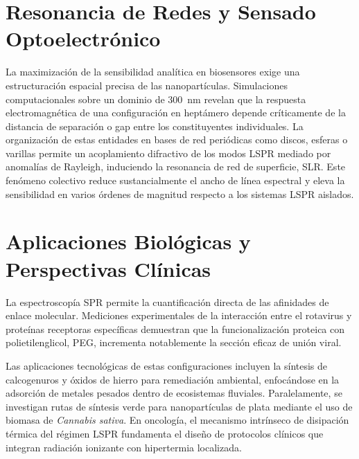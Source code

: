 \documentclass[pdflatex,sn-mathphys-num]{sn-jnl}
\theoremstyle{thmstyleone}%
\theoremstyle{thmstyletwo}%
\theoremstyle{thmstylethree}%
\begin{document}
\section{Resonancia de Redes y Sensado Optoelectrónico}
\label{sec:redes}

La maximización de la sensibilidad analítica en biosensores exige una
estructuración espacial precisa de las nanopartículas. Simulaciones
computacionales sobre un dominio de \qty{300}{\nano\meter} revelan que la
respuesta electromagnética de una configuración en heptámero depende
críticamente de la distancia de separación o gap entre los constituyentes
individuales. La organización de estas entidades en bases de red
periódicas como discos, esferas o varillas permite un acoplamiento
difractivo de los modos LSPR mediado por anomalías de Rayleigh, induciendo la
resonancia de red de superficie, SLR. Este fenómeno colectivo
reduce sustancialmente el ancho de línea espectral y eleva la sensibilidad en
varios órdenes de magnitud respecto a los sistemas LSPR aislados.

\section{Aplicaciones Biológicas y Perspectivas Clínicas}
\label{sec:aplicaciones}

La espectroscopía SPR permite la cuantificación directa de las afinidades de
enlace molecular. Mediciones experimentales de la interacción entre
el rotavirus y proteínas receptoras específicas demuestran que la
funcionalización proteica con polietilenglicol, PEG, incrementa notablemente
la sección eficaz de unión viral.

Las aplicaciones tecnológicas de estas configuraciones incluyen la síntesis de
calcogenuros y óxidos de hierro para remediación ambiental, enfocándose en la
adsorción de metales pesados dentro de ecosistemas fluviales.
Paralelamente, se investigan rutas de síntesis verde para nanopartículas de
plata mediante el uso de biomasa de \textit{Cannabis sativa}. En
oncología, el mecanismo intrínseco de disipación térmica del régimen LSPR
fundamenta el diseño de protocolos clínicos que integran radiación ionizante
con hipertermia localizada.
\end{document}
